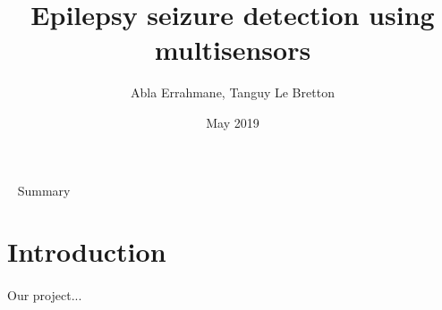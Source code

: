 \documentclass[12pt]{article}
\title{Epilepsy seizure detection using multisensors}
\author{Abla Errahmane, Tanguy Le Bretton}
\date{May 2019}
\begin{document}
\maketitle

\newpage
~
\newpage
Summary

\newpage
\section{Introduction}
\paragraph{}
Our project...
\end{document}
